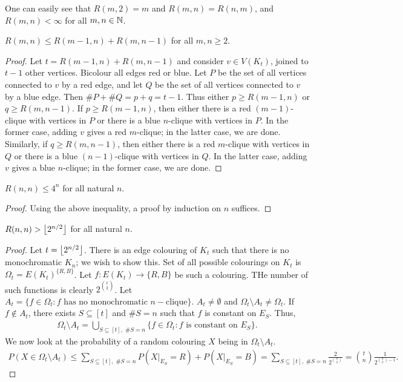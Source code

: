 One can easily see that $R(m,2) = m$ and $R(m,n) = R(n,m)$, and $R(m,n) < \infty$ for all $m,n \in \mathbb{N}$.

\begin{lemma}
    $R(m,n) \leq R(m-1,n) + R(m,n-1)$ for all $m,n \geq 2$.
\end{lemma}
\begin{proof}
    Let $t = R(m-1,n) + R(m,n-1)$ and consider $v \in V(K_{t})$, joined to $t-1$ other vertices. Bicolour all edges red or blue. Let $P$ be the set of all vertices connected to $v$ by a red edge, and let $Q$ be the set of all vertices connected to $v$ by a blue edge. Then $\#P + \#Q = p+q = t-1$. Thus either $p \geq R(m-1,n)$ or $q \geq R(m,n-1)$. If $p \geq R(m-1,n)$, then either there is a red $(m-1)$-clique with vertices in $P$ or there is a blue $n$-clique with vertices in $P$. In the former case, adding $v$ gives a red $m$-clique; in the latter case, we are done. Similarly, if $q \geq R(m,n-1)$, then either there is a red $m$-clique with vertices in $Q$ or there is a blue $(n-1)$-clique with vertices in $Q$. In the latter case, adding $v$ gives a blue $n$-clique; in the former case, we are done.
\end{proof}

\begin{lemma}
    $R(n,n) \leq 4^{n}$ for all natural $n$.
\end{lemma}
\begin{proof}
    Using the above inequality, a proof by induction on $n$ suffices.
\end{proof}

\begin{lemma}
    $R(n,n) > \left\lfloor 2^{n/2} \right\rfloor$ for all natural $n$.
\end{lemma}
\begin{proof}
    Let $t = \left\lfloor 2^{n/2} \right\rfloor$. There is an edge colouring of $K_{t}$ such that there is no monochromatic $K_{n}$; we wish to show this. Set of all possible colourings on $K_{t}$ is $\Omega_{t} = E(K_{t})^{\{R,B\}}$. Let $f:E(K_{t}) \to \{R,B\}$ be such a colouring. THe number of such functions is clearly $2^{\binom{t}{2}}$. Let $A_{t} = \{f \in \Omega_{t} : f \text{ has no monochromatic } n-\text{clique}\}$. $A_{t} \neq\emptyset$ and $\Omega_{t} \setminus A_{t} \neq \Omega_{t}$. If $f \notin A_{t}$, there exists $S \subseteq [t]$ and $\#S = n$ such that $f$ is constant on $E_{S}$. Thus,
    \begin{align}
        \Omega_{t} \setminus A_{t} = \bigcup_{S \subseteq [t],\; \#S = n} \{f \in \Omega_{t} : f \text{ is constant on } E_{S}\}.
    \end{align}
    We now look at the probability of a random colouring $X$ being in $\Omega_{t} \setminus A_{t}$.
    \begin{align}
        P(X \in \Omega_{t} \setminus A_{t}) \leq \sum_{S \subseteq [t],\; \#S = n} P(X|_{E_{S}} = R) + P(X|_{E_{S}} = B) = \sum_{S \subseteq [t],\; \#S = n} \frac{2}{2^{\binom{n}{2}}} = \binom{t}{n} \frac{1}{2^{\binom{n}{2}-1}}.
    \end{align}
    
\end{proof}

